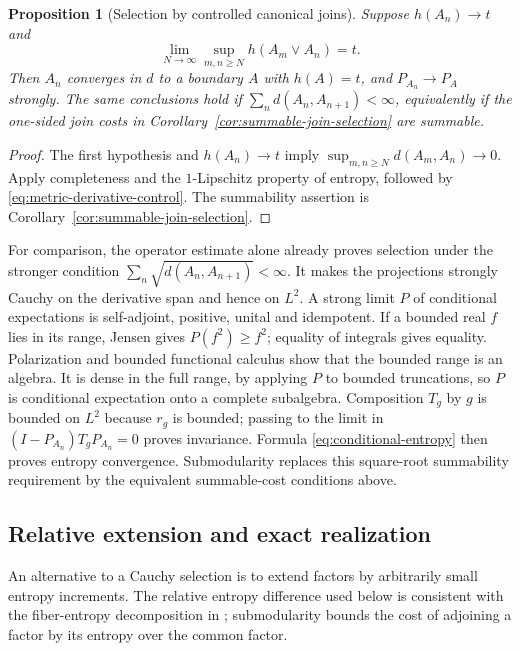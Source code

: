 \documentclass[11pt,letterpaper]{amsart}
\newtheorem{proposition}[theorem]{Proposition}
\theoremstyle{definition}
\theoremstyle{remark}
\numberwithin{equation}{section}
\begin{document}
\begin{proposition}[Selection by controlled canonical joins]
Suppose $h(A_n)\to t$ and
\[
 \lim_{N\to\infty}\sup_{m,n\ge N}h(A_m\vee A_n)=t.
\]
Then $A_n$ converges in $d$ to a boundary $A$ with $h(A)=t$,
and $P_{A_n}\to P_A$ strongly. The same conclusions hold if
$\sum_n d(A_n,A_{n+1})<\infty$, equivalently if the one-sided
join costs in Corollary~\ref{cor:summable-join-selection} are summable.
\end{proposition}
\begin{proof}
The first hypothesis and $h(A_n)\to t$ imply
$\sup_{m,n\ge N}d(A_m,A_n)\to0$. Apply completeness and the
$1$-Lipschitz property of entropy, followed by
\eqref{eq:metric-derivative-control}. The summability assertion is
Corollary~\ref{cor:summable-join-selection}.
\end{proof}

For comparison, the operator estimate alone already proves selection
under the stronger condition $\sum_n\sqrt{d(A_n,A_{n+1})}<\infty$.
It makes the projections strongly Cauchy on the derivative span and
hence on $L^2$. A strong limit $P$ of conditional expectations is
self-adjoint, positive, unital and idempotent. If a bounded real $f$
lies in its range, Jensen gives $P(f^2)\ge f^2$; equality of integrals
gives equality. Polarization and bounded functional calculus show that
the bounded range is an algebra. It is dense in the full range, by
applying $P$ to bounded truncations, so $P$ is conditional expectation
onto a complete subalgebra. Composition $T_g$ by $g$ is bounded on
$L^2$ because $r_g$ is bounded; passing to the limit in
$(I-P_{A_n})T_gP_{A_n}=0$ proves invariance. Formula
\eqref{eq:conditional-entropy} then proves entropy convergence.
Submodularity replaces this square-root summability requirement by
the equivalent summable-cost conditions above.

\subsection{Relative extension and exact realization}

An alternative to a Cauchy selection is to extend factors by arbitrarily
small entropy increments. The relative entropy difference used below
is consistent with the fiber-entropy decomposition in
\cite[eqs.~(2.5)--(2.6)]{HT}; submodularity bounds the cost of adjoining
a factor by its entropy over the common factor.
\end{document}
